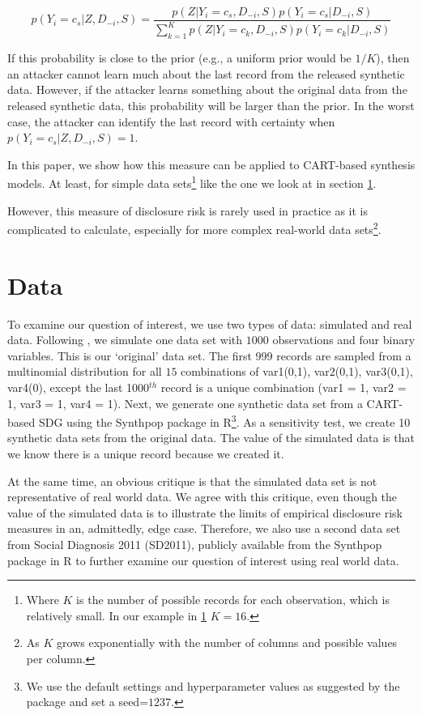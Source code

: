 \documentclass[a4paper,11pt]{style/uneceart}
\begin{document}
\begin{equation}\label{eq:bayesian}
p(Y_i = c_s|Z, D_{-i}, S) = \frac{p(Z|Y_i = c_s, D_{-i}, S)p(Y_i=c_s|D_{-i}, S)}{\sum_{k=1}^Kp(Z|Y_i = c_k, D_{-i}, S)p(Y_i=c_k|D_{-i}, S)}
\end{equation}

If this probability is close to the prior (e.g., a uniform prior would be $1/K$), then an attacker cannot learn much about the last record from the released synthetic data. However, if the attacker learns something about the original data from the released synthetic data, this probability will be larger than the prior. In the worst case, the attacker can identify the last record with certainty when $p(Y_i = c_s|Z, D_{-i}, S) = 1$.

In this paper, we show how this measure can be applied to CART-based synthesis models. At least, for simple data sets\footnote{Where $K$ is the number of possible records for each observation, which is relatively small. In our example in \ref{sec:data} $K = 16$.} like the one we look at in section \ref{sec:data}. 

However, this measure of disclosure risk is rarely used in practice as it is complicated to calculate, especially for more complex real-world data sets\footnote{As $K$ grows exponentially with the number of columns and possible values per column.}.

\section{Data}\label{sec:data}

To examine our question of interest, we use two types of data: simulated and real data.  Following \citet{reiter2014bayesian}, we simulate one data set with $1000$ observations and four binary variables.  This is our `original' data set.  The first 999 records are sampled from a multinomial distribution for all $15$ combinations of var1(0,1), var2(0,1), var3(0,1), var4(0), except the last 1000$^{th}$ record is a unique combination (var1 = 1, var2 = 1, var3 = 1, var4 = 1).  Next, we generate one synthetic data set from a CART-based SDG using the Synthpop package in R\footnote{We use the default settings and hyperparameter values as suggested by the package and set a seed=$1237$.}.  As a sensitivity test, we create 10 synthetic data sets from the original data.  The value of the simulated data is that we know there is a unique record because we created it.

At the same time, an obvious critique is that the simulated data set is not representative of real world data.  We agree with this critique, even though the value of the simulated data is to illustrate the limits of empirical disclosure risk measures in an, admittedly, edge case.  Therefore, we also use a second data set from Social Diagnosis 2011 (SD2011), publicly available from the Synthpop package in R to further examine our question of interest using real world data.
\end{document}
